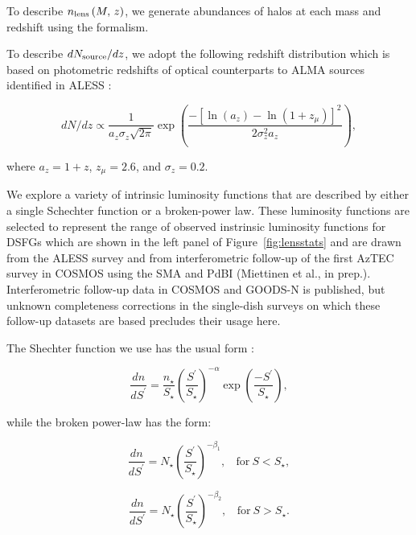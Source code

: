 \documentclass[iop]{emulateapj}
\begin{document}
To describe $n_{\rm lens}\,(M, \, z)$, we generate abundances of halos at
each mass and redshift using the \citet{Sheth:1999kx} formalism. 

To describe $dN_{\rm source}/dz$, we adopt the following redshift distribution
which is based on photometric redshifts of optical counterparts to ALMA sources
identified in ALESS \citep{Simpson:2014lr}:

\begin{equation}
    dN/dz \propto \frac{1}{a_z\sigma_z \sqrt{2\pi}}
    \exp\left( \frac{-[\ln(a_z) - \ln(1 + z_\mu)]^2} {2\sigma_z^2 a_z} \right),
\end{equation}

\noindent where $a_z = 1 + z$, $z_\mu = 2.6$, and $\sigma_z = 0.2$. 

We explore a variety of intrinsic luminosity functions that are described by
either a single Schechter function or a broken-power law.  These luminosity
functions are selected to represent the range of observed instrinsic luminosity
functions for DSFGs which are shown in the left panel of
Figure~\ref{fig:lensstats} and are drawn from the ALESS survey
\citep{Karim:2013lr} and from interferometric follow-up of the first AzTEC
survey in COSMOS \citep{Scott:2008qy} using the SMA \citep{Younger:2007fk,
Younger:2009lr} and PdBI (Miettinen et al., in prep.).  Interferometric
follow-up data in COSMOS \citep{Smolcic:2012zl} and GOODS-N
\citep{Barger:2012yg} is published, but unknown completeness corrections in the
single-dish surveys on which these follow-up datasets are based precludes their
usage here.

The Shechter function we use has the usual form \citep{Schechter:1976yq}:

\begin{equation}
\frac{dn}{dS^\prime} = \frac{n_\star}{S_\star}
\left(\frac{S^\prime}{S_\star}\right)^{-\alpha}
\exp\left(\frac{-S^\prime}{S_\star}\right),
\end{equation}

\noindent while the broken power-law has the form:

\begin{equation}
\frac{dn}{dS^\prime} = N_\star\left(\frac{S^\prime}{S_\star}\right)^{-\beta_1},~~~~\textrm{for}~S<S_\star,
\end{equation} 

\begin{displaymath}
\frac{dn}{dS^\prime} = N_\star\left(\frac{S^\prime}{S_\star}\right)^{-\beta_2},~~~~\textrm{for}~S>S_\star.
\end{displaymath}
\end{document}
